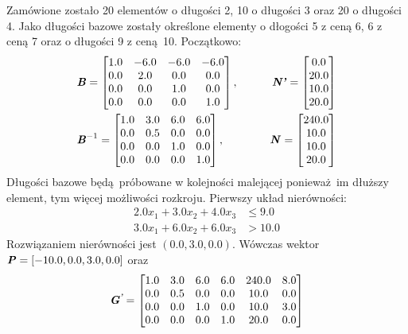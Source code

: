 Zamówione zostało 20 elementów o długości 2, 10 o długości 3 oraz 20 o długości 4. Jako długości bazowe zostały określone elementy o dłogości 5 z ceną 6, 6 z ceną 7 oraz o długości 9 z ceną 10. \newline
Początkowo:
\begin{equation*}
  \begin{aligned}
    &\textbf{\textit{B}} =
    \begin{bmatrix}
      1.0 & -6.0 & -6.0 & -6.0 \\
      0.0 & 2.0 & 0.0 & 0.0 \\
      0.0 & 0.0 & 1.0 & 0.0 \\
      0.0 & 0.0 & 0.0 & 1.0
    \end{bmatrix}, \qquad
    &\textbf{\textit{N'}} =
    \begin{bmatrix}
      0.0\\
      20.0\\
      10.0\\
      20.0
    \end{bmatrix} \\
    &\textbf{\textit{B}}^{-1} =
    \begin{bmatrix}
      1.0 & 3.0 & 6.0 & 6.0 \\
      0.0 & 0.5 & 0.0 & 0.0 \\
      0.0 & 0.0 & 1.0 & 0.0 \\
      0.0 & 0.0 & 0.0 & 1.0
    \end{bmatrix}, \quad
    &\textbf{\textit{N}} =
    \begin{bmatrix}
      240.0\\
      10.0\\
      10.0\\
      20.0
    \end{bmatrix}
  \end{aligned}
\end{equation*}
Długości bazowe będą próbowane w kolejności malejącej ponieważ im dłuższy element, tym więcej możliwości rozkroju. Pierwszy układ nierówności:
\begin{equation*}
  \begin{aligned}
    2.0 x_{1}+ 3.0 x_{2}+ 4.0 x_{3} & \le 9.0 \\
    3.0 x_{1}+ 6.0 x_{2}+ 6.0 x_{3} & > 10.0
  \end{aligned}
\end{equation*}
Rozwiązaniem nierówności jest $(0.0,3.0,0.0)$. Wówczas wektor $\textbf{\textit{P}} = [-10.0, 0.0, 3.0, 0.0]$ oraz
\begin{equation*}
  \begin{aligned}
    \textbf{\textit{G\textsuperscript{'}}} =
    \begin{bmatrix}
      1.0 & 3.0 & 6.0 & 6.0 & 240.0 & 8.0  \\
      0.0 & 0.5 & 0.0 & 0.0 & 10.0 & 0.0 \\
      0.0 & 0.0 & 1.0 & 0.0 & 10.0 & 3.0 \\
      0.0 & 0.0 & 0.0 & 1.0 & 20.0 & 0.0
    \end{bmatrix}
  \end{aligned}
\end{equation*}
